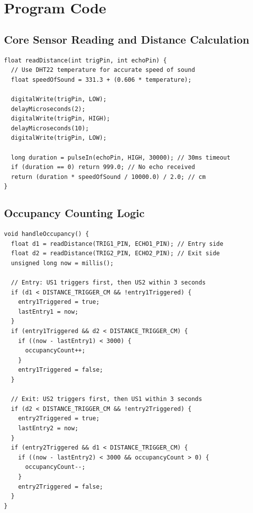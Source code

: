 \documentclass[12pt,a4paper]{article}
\begin{document}
\newpage

\section{Program Code}

\subsection{Core Sensor Reading and Distance Calculation}

\begin{lstlisting}[caption={Temperature-Compensated Distance Measurement}]
float readDistance(int trigPin, int echoPin) {
  // Use DHT22 temperature for accurate speed of sound
  float speedOfSound = 331.3 + (0.606 * temperature);

  digitalWrite(trigPin, LOW);
  delayMicroseconds(2);
  digitalWrite(trigPin, HIGH);
  delayMicroseconds(10);
  digitalWrite(trigPin, LOW);

  long duration = pulseIn(echoPin, HIGH, 30000); // 30ms timeout
  if (duration == 0) return 999.0; // No echo received
  return (duration * speedOfSound / 10000.0) / 2.0; // cm
}
\end{lstlisting}

\subsection{Occupancy Counting Logic}

\begin{lstlisting}[caption={Directional People Counter Using Dual Ultrasonics}]
void handleOccupancy() {
  float d1 = readDistance(TRIG1_PIN, ECHO1_PIN); // Entry side
  float d2 = readDistance(TRIG2_PIN, ECHO2_PIN); // Exit side
  unsigned long now = millis();

  // Entry: US1 triggers first, then US2 within 3 seconds
  if (d1 < DISTANCE_TRIGGER_CM && !entry1Triggered) {
    entry1Triggered = true;
    lastEntry1 = now;
  }
  if (entry1Triggered && d2 < DISTANCE_TRIGGER_CM) {
    if ((now - lastEntry1) < 3000) {
      occupancyCount++;
    }
    entry1Triggered = false;
  }

  // Exit: US2 triggers first, then US1 within 3 seconds  
  if (d2 < DISTANCE_TRIGGER_CM && !entry2Triggered) {
    entry2Triggered = true;
    lastEntry2 = now;
  }
  if (entry2Triggered && d1 < DISTANCE_TRIGGER_CM) {
    if ((now - lastEntry2) < 3000 && occupancyCount > 0) {
      occupancyCount--;
    }
    entry2Triggered = false;
  }
}
\end{lstlisting}
\end{document}
